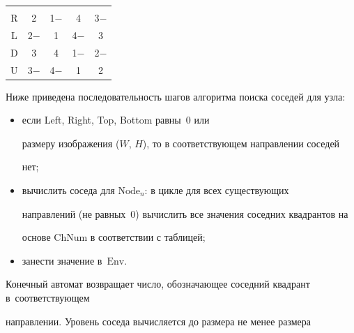 \begin{table}
\begin{center}
\begin{tabular}{|c|c|c|c|c|}
\multicolumn{1}{p{16pt}|}{\hspace*{16pt}}\\[-10pt]

R & 2\hphantom{$-$}& 1$-$& 4\hphantom{$-$}& 3$-$\\ 

L & 2$-$& 1\hphantom{$-$}& 4$-$& 3\hphantom{$-$}\\

D & 3\hphantom{$-$}& 4\hphantom{$-$}& 1$-$& 2$-$\\

U & 3$-$& 4$-$& 1\hphantom{$-$}& 2\hphantom{$-$}\\ 

\hline

\end{tabular}

\end{center}


\end{table}




Ниже приведена последовательность шагов алгоритма поиска соседей для узла:

  \begin{itemize}

\item если {Left}, {Right}, {Top}, {Bottom} равны~0 или 

размеру изображения ($W$, $H$), то в соответствующем направлении соседей 

нет;

\item вычислить соседа для $\mathrm{Node}_n$: в цикле для всех существующих 

направлений (не равных~0) вычислить все значения соседних квадрантов на 

основе $\mathrm{ChNum}$ в соответствии с таблицей;

\item занести значение в~$\mathrm{Env}$.

\end{itemize}



  Конечный автомат возвращает число, обозначающее соседний квадрант в~со\-от\-вет\-ствующем 

направлении. Уровень соседа вычисляется до размера не менее размера 

